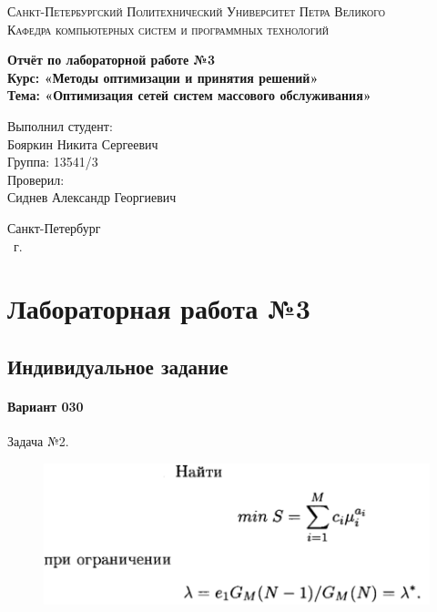 \documentclass[14pt,a4paper,report]{report}
\begin{document}
\def\contentsname{Содержание}

\begin{titlepage}
	\begin{center}
		\textsc{Санкт-Петербургский Политехнический 
			Университет Петра Великого\\[5mm]
			Кафедра компьютерных систем и программных технологий}
		
		\vfill
		
		\textbf{Отчёт по лабораторной работе №3\\[3mm]
			Курс: «Методы оптимизации и принятия решений»\\[3mm]
			Тема: «Оптимизация сетей систем массового обслуживания»\\[35mm]
			}
	\end{center}
	
	\hfill
	\begin{minipage}{.5\textwidth}
		Выполнил студент:\\[2mm] 
		Бояркин Никита Сергеевич\\
		Группа: 13541/3\\[5mm]
		
		Проверил:\\[2mm] 
		Сиднев Александр Георгиевич
	\end{minipage}
	\vfill
	\begin{center}
		Санкт-Петербург\\ \the\year\ г.
	\end{center}
\end{titlepage}

\tableofcontents
\clearpage

\chapter{Лабораторная работа №3}

\section{Индивидуальное задание}

\subsubsection{Вариант 030}

Задача №2.

\begin{figure}[h!]
	\centering
	\includegraphics[scale = 0.39]{images/1.png}
	\label{image:1}
\end{figure}
\end{document}
